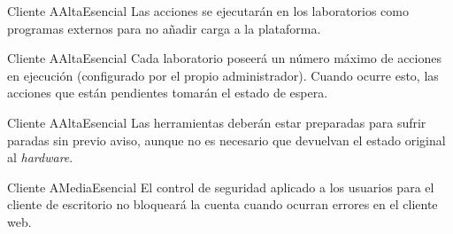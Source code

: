 {Cliente A}{Alta}{Esencial}
{
Las acciones se ejecutarán en los laboratorios como programas externos 
para no añadir carga a la plataforma.
}

{Cliente A}{Alta}{Esencial}
{
Cada laboratorio poseerá un número máximo de acciones en ejecución 
(configurado por el propio administrador). Cuando ocurre esto, las 
acciones que están pendientes tomarán el estado de espera.
}

{Cliente A}{Alta}{Esencial}
{
Las herramientas deberán estar preparadas para sufrir paradas sin 
previo aviso, aunque no es necesario que devuelvan el estado original 
al \emph{hardware}.
}

{Cliente A}{Media}{Esencial}
{
El control de seguridad aplicado a los usuarios para el cliente de 
escritorio no bloqueará la cuenta cuando ocurran errores en el cliente 
web.
}
